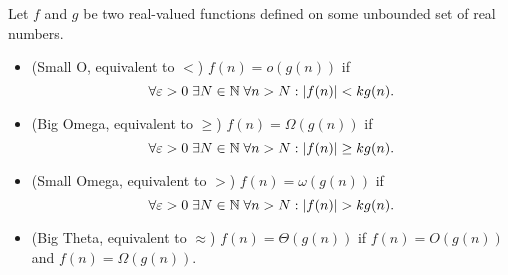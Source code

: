 \begin{definition}
  Let $f$ and $g$ be two real-valued functions defined on some unbounded set of real numbers.
  \begin{itemize}
    \item (Small O, equivalent to $<$) $f(n) = o(g(n))$ if \[\forall \varepsilon > 0 \; \exists N \in \mathbb N \; \forall n > N: \lvert f(n) \rvert < kg(n).\]
    \item (Big Omega, equivalent to $\geq$) $f(n) = \Omega(g(n))$ if \[\forall \varepsilon > 0 \; \exists N \in \mathbb N \; \forall n > N: \lvert f(n) \rvert \geq kg(n).\]
    \item (Small Omega, equivalent to $>$) $f(n) = \omega(g(n))$ if \[\forall \varepsilon > 0 \; \exists N \in \mathbb N \; \forall n > N: \lvert f(n) \rvert > kg(n).\]
    \item (Big Theta, equivalent to $\approx$) $f(n) = \Theta(g(n))$ if $f(n) = O(g(n))$ and $f(n) = \Omega(g(n))$. 
  \end{itemize}
\end{definition}
